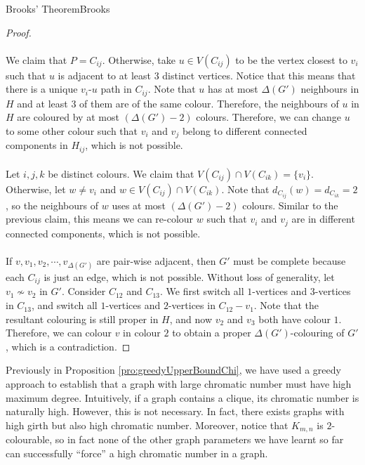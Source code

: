 \documentclass[math, code]{amznotes}
\theoremstyle{remark}
\begin{document}
\begin{thmbox}{Brooks' Theorem}{Brooks}
\begin{proof}
        \\\\
        We claim that $P = C_{ij}$. Otherwise, take $u \in V(C_{ij})$ to be the vertex closest to $v_i$ such that $u$ is adjacent to at least $3$ distinct vertices. Notice that this means that there is a unique $v_i$-$u$ path in $C_{ij}$. Note that $u$ has at most $\Delta(G')$ neighbours in $H$ and at least $3$ of them are of the same colour. Therefore, the neighbours of $u$ in $H$ are coloured by at most $(\Delta(G') - 2)$ colours. Therefore, we can change $u$ to some other colour such that $v_i$ and $v_j$ belong to different connected components in $H_{ij}$, which is not possible.
        \\\\
        Let $i, j, k$ be distinct colours. We claim that $V(C_{ij}) \cap V(C_{ik}) = \{v_i\}$. Otherwise, let $w \neq v_i$ and $w \in V(C_{ij}) \cap V(C_{ik})$. Note that $d_{C_{ij}}(w) = d_{C_{ik}} = 2$, so the neighbours of $w$ uses at most $(\Delta(G') - 2)$ colours. Similar to the previous claim, this means we can re-colour $w$ such that $v_i$ and $v_j$ are in different connected components, which is not possible.
        \\\\
        If $v, v_1, v_2, \cdots, v_{\Delta(G')}$ are pair-wise adjacent, then $G'$ must be complete because each $C_{ij}$ is just an edge, which is not possible. Without loss of generality, let $v_1 \not\sim v_2$ in $G'$. Consider $C_{12}$ and $C_{13}$. We first switch all $1$-vertices and $3$-vertices in $C_{13}$, and switch all $1$-vertices and $2$-vertices in $C_{12} - v_1$. Note that the resultant colouring is still proper in $H$, and now $v_2$ and $v_3$ both have colour $1$. Therefore, we can colour $v$ in colour $2$ to obtain a proper $\Delta(G')$-colouring of $G'$, which is a contradiction.
    \end{proof}
\end{thmbox}
Previously in Proposition \ref{pro:greedyUpperBoundChi}, we have used a greedy approach to establish that a graph with large chromatic number must have high maximum degree. Intuitively, if a graph contains a clique, its chromatic number is naturally high. However, this is not necessary. In fact, there exists graphs with high girth but also high chromatic number. Moreover, notice that $K_{m, n}$ is $2$-colourable, so in fact none of the other graph parameters we have learnt so far can successfully ``force'' a high chromatic number in a graph.
\end{document}
